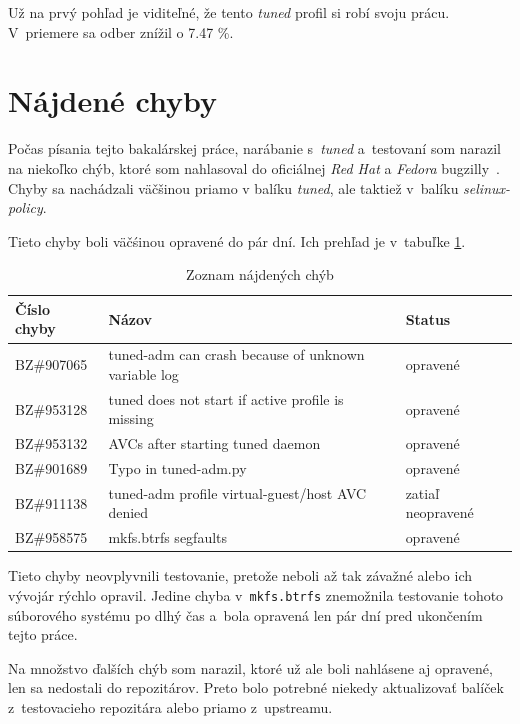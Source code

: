 Už na prvý pohľad je viditeľné, že tento \emph{tuned} profil si robí svoju
prácu. V~priemere sa odber znížil o 7.47 \%. 

%
%

\section{Nájdené chyby}

Počas písania tejto bakalárskej práce, narábanie s~\emph{tuned} a~testovaní som
narazil na niekoľko chýb, ktoré som nahlasoval do oficiálnej \emph{Red Hat} a
\emph{Fedora} bugzilly~\cite{rhBugzilla}. Chyby sa nachádzali väčšinou priamo v
balíku \emph{tuned}, ale taktiež v~balíku \emph{selinux-policy}.

Tieto chyby boli väčśinou opravené do pár dní. Ich prehľad je v~tabuľke \ref{tab:bugs}.

\begin{table}[H]
\begin{center}
\begin{tabular}{|l|l|l|}
    \hline
    \textbf{Číslo chyby} & \textbf{Názov} & \textbf{Status} \\
    \hline
    BZ\#907065 & tuned-adm can crash because of unknown variable log & opravené \\
    BZ\#953128 & tuned does not start if active profile is missing & opravené \\
    BZ\#953132 & AVCs after starting tuned daemon & opravené \\
    BZ\#901689 & Typo in tuned-adm.py & opravené \\
    BZ\#911138 & tuned-adm profile virtual-guest/host AVC denied & zatiaľ neopravené \\
    BZ\#958575 & mkfs.btrfs segfaults & opravené \\
    \hline
\end{tabular}
\caption{Zoznam nájdených chýb}
\label{tab:bugs}
\end{center}
\end{table}

Tieto chyby neovplyvnili testovanie, pretože neboli až tak závažné alebo ich
vývojár rýchlo opravil. Jedine chyba v~\texttt{mkfs.btrfs} znemožnila
testovanie tohoto súborového systému po dlhý čas a~bola opravená len pár dní
pred ukončením tejto práce.

Na množstvo ďalších chýb som narazil, ktoré už ale boli nahlásene aj opravené,
len sa nedostali do repozitárov. Preto bolo potrebné niekedy aktualizovať
balíček z~testovacieho repozitára alebo priamo z~upstreamu.


